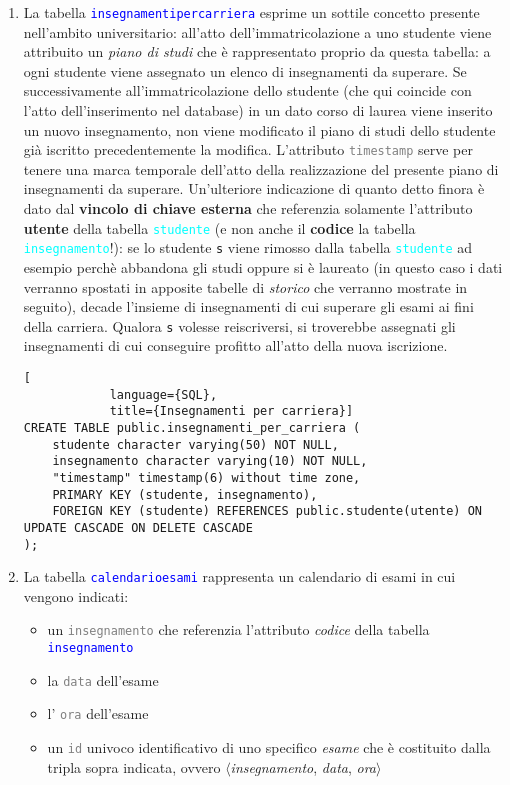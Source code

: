 \documentclass{article}
\newcommand{\tabb}[1]{\texttt{\textcolor{blue}{#1}}}
\newcommand{\tab}[1]{\texttt{\textcolor{cyan}{#1}}}
\newcommand{\attr}[1]{\texttt{\textcolor{gray}{#1}}}
\newcommand{\und}[0]{\textunderscore}
\begin{document}
\begin{enumerate}
        \item La tabella \tabb{insegnamenti\und per\und carriera} esprime un sottile concetto presente nell'ambito universitario: all'atto dell'immatricolazione a uno studente viene attribuito un \textit{piano di studi} che è rappresentato proprio da questa tabella: a ogni studente viene assegnato un elenco di insegnamenti da superare. Se successivamente all'immatricolazione dello studente (che qui coincide con l'atto dell'inserimento nel database) in un dato corso di laurea viene inserito un nuovo insegnamento, non viene modificato il piano di studi dello studente già iscritto precedentemente la modifica. L'attributo \attr{timestamp} serve per tenere una marca temporale dell'atto della realizzazione del presente piano di insegnamenti da superare. Un'ulteriore indicazione di quanto detto finora è dato dal \textbf{vincolo di chiave esterna} che referenzia solamente l'attributo \textbf{utente} della tabella \tab{studente} (e non anche il \textbf{codice} la tabella \tab{insegnamento}!): se lo studente \texttt{s} viene rimosso dalla tabella \tab{studente} ad esempio perchè abbandona gli studi oppure si è laureato (in questo caso i dati verranno spostati in apposite tabelle di \textit{storico} che verranno mostrate in seguito), decade l'insieme di insegnamenti di cui superare gli esami ai fini della carriera. Qualora \texttt{s} volesse reiscriversi, si troverebbe assegnati gli insegnamenti di cui conseguire profitto all'atto della nuova iscrizione.
        \begin{lstlisting}[
            language={SQL},
            title={Insegnamenti per carriera}]
CREATE TABLE public.insegnamenti_per_carriera (
    studente character varying(50) NOT NULL,
    insegnamento character varying(10) NOT NULL,
    "timestamp" timestamp(6) without time zone,
    PRIMARY KEY (studente, insegnamento),
    FOREIGN KEY (studente) REFERENCES public.studente(utente) ON UPDATE CASCADE ON DELETE CASCADE
);
        \end{lstlisting}

        \pagebreak

        \item La tabella \tabb{calendario\und esami} rappresenta un calendario di esami in cui vengono indicati:
        \begin{itemize}
            \item un \attr{insegnamento} che referenzia l'attributo \textit{codice} della tabella \tabb{insegnamento}
            \item la \attr{data} dell'esame
            \item l' \attr{ora} dell'esame
            \item un \attr{id} univoco identificativo di uno specifico \textit{esame} che è costituito dalla tripla sopra indicata, ovvero $\langle$\textit{insegnamento}, \textit{data}, \textit{ora}$\rangle$


\end{itemize}
\end{enumerate}
\end{document}
